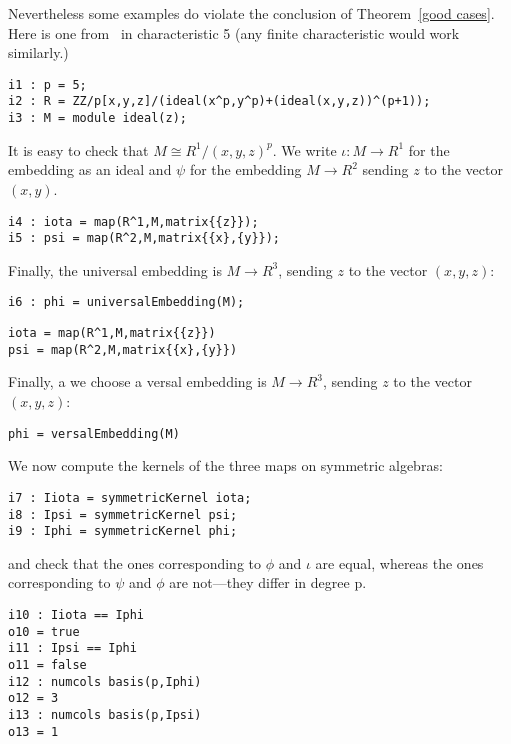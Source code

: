 \documentclass[twoside,12pt, leqno]{amsart}
\begin{document}
Nevertheless some examples do violate the conclusion of Theorem~\ref{good cases}. Here is one from~\cite{EHU}
in characteristic 5 (any finite characteristic would work similarly.)
 \begin{footnotesize}
  \begin{verbatim}
i1 : p = 5;
i2 : R = ZZ/p[x,y,z]/(ideal(x^p,y^p)+(ideal(x,y,z))^(p+1));
i3 : M = module ideal(z);
 \end{verbatim}
\end{footnotesize}
    It is easy to check that $M \cong R^1/(x,y,z)^p$.
     We write $\iota: M\to R^1$ for the embedding as an ideal
     and $\psi$ for the embedding $M \to R^2$ sending $z$ to the vector $(x,y)$.
\begin{footnotesize} \begin{verbatim}
i4 : iota = map(R^1,M,matrix{{z}});
i5 : psi = map(R^2,M,matrix{{x},{y}});
\end{verbatim}\end{footnotesize}
      Finally, the universal embedding is $M \to R^3$,
     sending $z$ to the vector $(x,y,z)$:
\begin{footnotesize}\begin{verbatim}
i6 : phi = universalEmbedding(M);
\end{verbatim}\end{footnotesize}
 \begin{verbatim}
iota = map(R^1,M,matrix{{z}}) 
psi = map(R^2,M,matrix{{x},{y}})
\end{verbatim}
\begin{normalsize}
      Finally, a we choose a versal embedding is $M \to R^3$,
     sending $z$ to the vector $(x,y,z)$:
\end{normalsize}
\begin{verbatim}
phi = versalEmbedding(M)
\end{verbatim}
\begin{normalsize}
     We now compute the kernels of the three maps
     on symmetric algebras:
\begin{footnotesize}
 \begin{verbatim}
i7 : Iiota = symmetricKernel iota;
i8 : Ipsi = symmetricKernel psi;
i9 : Iphi = symmetricKernel phi;
\end{verbatim}
\end{footnotesize}
      and check that the ones corresponding to $\phi$ and $\iota$
     are equal, whereas the ones corresponding to $\psi$ and $\phi$
     are not---they differ in degree p.
\begin{footnotesize} \begin{verbatim}
i10 : Iiota == Iphi    
o10 = true
i11 : Ipsi == Iphi
o11 = false
i12 : numcols basis(p,Iphi) 
o12 = 3
i13 : numcols basis(p,Ipsi)
o13 = 1
\end{verbatim}
\end{footnotesize}
\end{normalsize}
\end{document}
